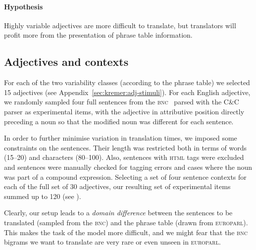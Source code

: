 \documentclass[output=paper]{LSP/langsci}
\begin{document}
\paragraph*{Hypothesis} 
Highly variable adjectives are more difficult to translate, but
translators will profit more from the presentation of phrase table
information.


\subsection{Adjectives and contexts} 
\label{sec:kremer:adjectives-contexts}

For each of the two variability classes (according to the phrase
table) we selected 15 adjectives (see
Appendix~\ref{sec:kremer:adj-stimuli}). For each English adjective, we
randomly sampled four full sentences from the
\textsc{bnc}~\citep{burnard95:_britis_nation_corpus} parsed with the
C\&C parser \citep{clark07:_wide_cover_effic_statis_parsin} as
experimental items, with the adjective in attributive position
directly preceding a noun so that the modified noun was different for
each sentence.

In order to further minimise variation in translation times, we
imposed some constraints on the sentences. Their length was restricted
both in terms of words (15--20) and characters (80--100). Also,
sentences with \textsc{html} tags were excluded and sentences were
manually checked for tagging errors and cases where the noun was part
of a compound expression.
%
Selecting a set of four sentence contexts for each of the full set of
30 adjectives, our resulting set of experimental items summed up to 120 (see
).


Clearly, our setup leads to a \textit{domain difference} between the
sentences to be translated (sampled from the \textsc{bnc}) and the
phrase table (drawn from \textsc{europarl}).  This makes the task of
the model more difficult, and we might fear that the \textsc{bnc}
bigrams we want to translate are very rare or even unseen in
\textsc{europarl}.
\end{document}
